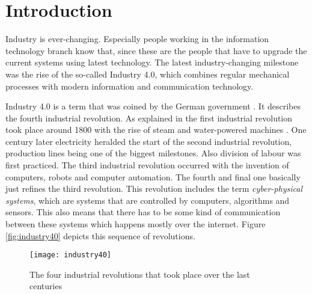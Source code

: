 \chapter{Introduction}
\label{ch:Introduction}




Industry is ever-changing. Especially people working in the information technology branch know that, since these are the people that have to upgrade the current systems using latest technology. The latest industry-changing milestone was the rise of the so-called Industry 4.0, which combines regular mechanical processes with modern information and communication technology.

Industry 4.0 is a term that was coined by the German government \autocite{Industrie4.0Paper}. It describes the fourth industrial revolution. As explained in  the first industrial revolution took place around 1800 with the rise of steam and water-powered machines \autocite{Industrie4.0History}. One century later electricity heralded the start of the second industrial revolution, production lines being one of the biggest milestones. Also division of labour was first practiced. The third industrial revolution occurred with the invention of computers, robots and computer automation. The fourth and final one basically just refines the third revolution. This revolution includes the term \textit{cyber-physical systems}, which are systems that are controlled by computers, algorithms and sensors. This also means that there has to be some kind of communication between these systems which happens mostly over the internet. Figure \vref{fig:industry40} depicts this sequence of revolutions.

\begin{figure}[H]
    \centering
    \texttt{[image: industry40]}
    \caption[The four industrial revolutions that took place over the last centuries]{The four industrial revolutions that took place over the last centuries\footnotemark}
    \label{fig:industry40}
\end{figure}


